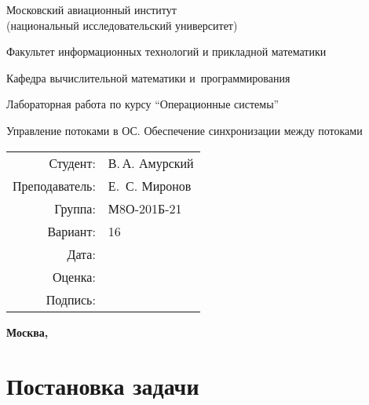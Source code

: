 \documentclass[pdf, unicode, 12pt, a4paper,oneside,fleqn]{article}
\begin{document}
\begin{titlepage}
    \begin{center}
        \bfseries

        {\Large Московский авиационный институт\\ (национальный исследовательский университет)}
        
        \vspace{48pt}
        
        {\large Факультет информационных технологий и прикладной математики}
        
        \vspace{36pt}
        
        {\large Кафедра вычислительной математики и~программирования}
        
        \vspace{48pt}
        
        Лабораторная работа  по курсу \enquote{Операционные системы}

        \vspace{48pt}

        Управление потоками в ОС. Обеспечение синхронизации между потоками
    \end{center}
    
    \vspace{140pt}
    
    \begin{flushright}
    \begin{tabular}{rl}
    Студент: & В.\,А. Амурский \\
    Преподаватель: & Е. \,С. Миронов \\
    Группа: & М8О-201Б-21 \\
    Вариант: & 16 \\
    Дата: & \\
    Оценка: & \\
    Подпись: & \\
    \end{tabular}
    \end{flushright}
    
    \vfill
    
    \begin{center}
    \bfseries
    Москва, \the\year
    \end{center}
\end{titlepage}
    
\pagebreak

\section{Постановка задачи}
\end{document}
